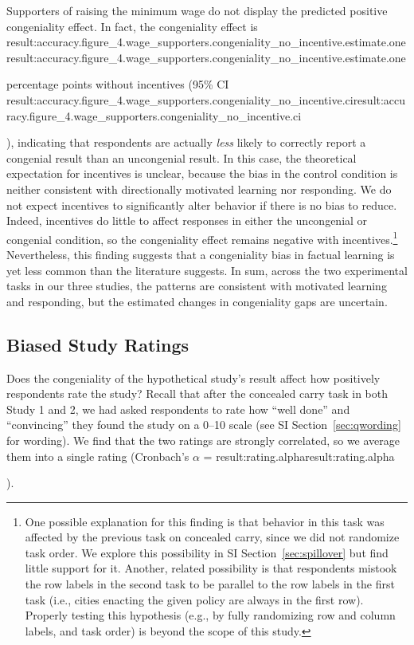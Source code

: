 \documentclass[12pt,letterpaper]{article}
\newcommand{\result}[1]{\ifcsname result:#1\endcsname\csname result:#1\endcsname\else\PackageError{replication}{Missing result #1}{}\fi}
\begin{document}
Supporters of raising the minimum wage do not display the predicted positive congeniality effect. In fact, the congeniality effect is \result{accuracy.figure_4.wage_supporters.congeniality_no_incentive.estimate.one} percentage points without incentives (95\% CI \result{accuracy.figure_4.wage_supporters.congeniality_no_incentive.ci}), indicating that respondents are actually {\it less} likely to correctly report a congenial result than an uncongenial result. In this case, the theoretical expectation for incentives is unclear, because the bias in the control condition is neither consistent with directionally motivated learning nor responding. We do not expect incentives to significantly alter behavior if there is no bias to reduce. Indeed, incentives do little to affect responses in either the uncongenial or congenial condition, so the congeniality effect remains negative with incentives.\footnote{
One possible explanation for this finding is that behavior in this task was affected by the previous task on concealed carry, since we did not randomize task order. We explore this possibility in SI Section~\ref{sec:spillover} but find little support for it.
Another, related possibility is that respondents mistook the row labels in the second task to be parallel to the row labels in the first task (i.e., cities enacting the given policy are always in the first row). Properly testing this hypothesis (e.g., by fully randomizing row and column labels, and task order) is beyond the scope of this study.}
Nevertheless, this finding suggests that a congeniality bias in factual learning is yet less common than the literature suggests.
In sum, across the two experimental tasks in our three studies, the patterns are consistent with motivated learning and responding, but the estimated changes in congeniality gaps are uncertain.

\subsection*{Biased Study Ratings}

Does the congeniality of the hypothetical study's result affect how positively respondents rate the study? Recall that after the concealed carry task in both Study 1 and 2, we had asked respondents to rate how ``well done'' and ``convincing'' they found the study on a 0--10 scale (see SI Section~\ref{sec:qwording} for wording). We find that the two ratings are strongly correlated, so we average them into a single rating (Cronbach's $\alpha$ = \result{rating.alpha}).
\end{document}
